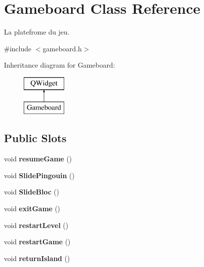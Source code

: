 \hypertarget{class_gameboard}{}\section{Gameboard Class Reference}
\label{class_gameboard}


La platefrome du jeu.  




{\ttfamily \#include $<$gameboard.\+h$>$}

Inheritance diagram for Gameboard\+:\begin{figure}[H]
\begin{center}
\leavevmode
\includegraphics[height=2.000000cm]{class_gameboard}
\end{center}
\end{figure}
\subsection*{Public Slots}
\begin{DoxyCompactItemize}
\item 
\hypertarget{class_gameboard_a1447e62dd9f78bcba4bdb06c4bfb8f10}{}void {\bfseries resume\+Game} ()\label{class_gameboard_a1447e62dd9f78bcba4bdb06c4bfb8f10}

\item 
\hypertarget{class_gameboard_ac59525fc331dafd4a1a290593327aa7c}{}void {\bfseries Slide\+Pingouin} ()\label{class_gameboard_ac59525fc331dafd4a1a290593327aa7c}

\item 
\hypertarget{class_gameboard_aa4e9c04466f50e1590269eab05773581}{}void {\bfseries Slide\+Bloc} ()\label{class_gameboard_aa4e9c04466f50e1590269eab05773581}

\item 
\hypertarget{class_gameboard_af76ebc877764feed7bc9d90452178f5f}{}void {\bfseries exit\+Game} ()\label{class_gameboard_af76ebc877764feed7bc9d90452178f5f}

\item 
\hypertarget{class_gameboard_a0d4ac38611d2ed24732823656ba613e0}{}void {\bfseries restart\+Level} ()\label{class_gameboard_a0d4ac38611d2ed24732823656ba613e0}

\item 
\hypertarget{class_gameboard_a6286269cadea4a1171539b52431d56c5}{}void {\bfseries restart\+Game} ()\label{class_gameboard_a6286269cadea4a1171539b52431d56c5}

\item 
\hypertarget{class_gameboard_a538d797eadaa51a15c999c14f984f76c}{}void {\bfseries return\+Island} ()\label{class_gameboard_a538d797eadaa51a15c999c14f984f76c}

\end{DoxyCompactItemize}
